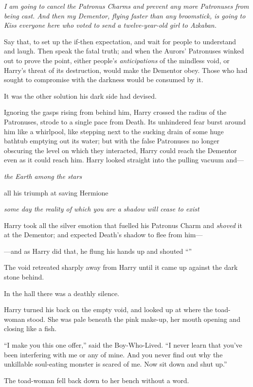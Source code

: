\emph{I am going to cancel the Patronus Charms and prevent any more Patronuses from being cast. And then my Dementor, flying faster than any broomstick, is going to Kiss everyone here who voted to send a twelve-year-old girl to Azkaban.}

Say that, to set up the if-then expectation, and wait for people to understand and laugh. Then speak the fatal truth; and when the Aurors’ Patronuses winked out to prove the point, either people’s \emph{anticipations} of the mindless void, or Harry’s threat of its destruction, would make the Dementor obey. Those who had sought to compromise with the darkness would be consumed by it.

It was the other solution his dark side had devised.

Ignoring the gasps rising from behind him, Harry crossed the radius of the Patronuses, strode to a single pace from Death. Its unhindered fear burst around him like a whirlpool, like stepping next to the sucking drain of some huge bathtub emptying out its water; but with the false Patronuses no longer obscuring the level on which they interacted, Harry could reach the Dementor even as it could reach him. Harry looked straight into the pulling vacuum and—

\emph{the Earth among the stars}

all his triumph at saving Hermione

\emph{some day the reality of which you are a shadow will cease to exist}

Harry took all the silver emotion that fuelled his Patronus Charm and \emph{shoved} it at the Dementor; and expected Death’s shadow to flee from him—

—and as Harry did that, he flung his hands up and shouted “”

The void retreated sharply away from Harry until it came up against the dark stone behind.

In the hall there was a deathly silence.

Harry turned his back on the empty void, and looked up at where the toad-woman stood. She was pale beneath the pink make-up, her mouth opening and closing like a fish.

“I make you this one offer,” said the Boy-Who-Lived. “I never learn that you’ve been interfering with me or any of mine. And you never find out why the unkillable soul-eating monster is scared of me. Now sit down and shut up.”

The toad-woman fell back down to her bench without a word.

